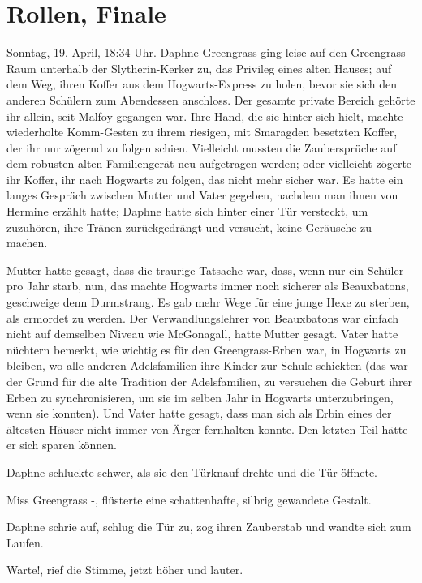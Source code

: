 \chapter{Rollen, Finale}

Sonntag, 19. April, 18:34 Uhr. Daphne Greengrass ging leise auf den
Greengrass-Raum unterhalb der Slytherin-Kerker zu, das Privileg eines alten
Hauses; auf dem Weg, ihren Koffer aus dem Hogwarts-Express zu holen, bevor sie
sich den anderen Schülern zum Abendessen anschloss. Der gesamte private Bereich
gehörte ihr allein, seit Malfoy gegangen war. Ihre Hand, die sie hinter sich
hielt, machte wiederholte Komm-Gesten zu ihrem riesigen, mit Smaragden besetzten
Koffer, der ihr nur zögernd zu folgen schien. Vielleicht mussten die
Zaubersprüche auf dem robusten alten Familiengerät neu aufgetragen werden; oder
vielleicht zögerte ihr Koffer, ihr nach Hogwarts zu folgen, das nicht mehr
sicher war. Es hatte ein langes Gespräch zwischen Mutter und Vater gegeben,
nachdem man ihnen von Hermine erzählt hatte; Daphne hatte sich hinter einer Tür
versteckt, um zuzuhören, ihre Tränen zurückgedrängt und versucht, keine
Geräusche zu machen.

Mutter hatte gesagt, dass die traurige Tatsache war, dass, wenn nur ein Schüler
pro Jahr starb, nun, das machte Hogwarts immer noch sicherer als Beauxbatons,
geschweige denn Durmstrang. Es gab mehr Wege für eine junge Hexe zu sterben, als
ermordet zu werden. Der Verwandlungslehrer von Beauxbatons war einfach nicht auf
demselben Niveau wie McGonagall, hatte Mutter gesagt. Vater hatte nüchtern
bemerkt, wie wichtig es für den Greengrass-Erben war, in Hogwarts zu bleiben, wo
alle anderen Adelsfamilien ihre Kinder zur Schule schickten (das war der Grund
für die alte Tradition der Adelsfamilien, zu versuchen die Geburt ihrer Erben zu
synchronisieren, um sie im selben Jahr in Hogwarts unterzubringen, wenn sie
konnten). Und Vater hatte gesagt, dass man sich als Erbin eines der ältesten
Häuser nicht immer von Ärger fernhalten konnte. Den letzten Teil hätte er sich
sparen können.

Daphne schluckte schwer, als sie den Türknauf drehte und die Tür öffnete.

\glqq{}Miss Greengrass -\grqq{}, flüsterte eine schattenhafte, silbrig gewandete
Gestalt.

Daphne schrie auf, schlug die Tür zu, zog ihren Zauberstab und wandte sich zum
Laufen.

\glqq{}Warte!\grqq{}, rief die Stimme, jetzt höher und lauter.

